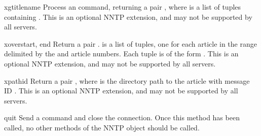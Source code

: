 \begin{methoddesc}{xgtitle}{name}
Process an  command, returning a pair , where  is a list of tuples containing
.
This is an optional NNTP extension, and may not be supported by all
servers.
\end{methoddesc}

\begin{methoddesc}{xover}{start, end}
Return a pair .   is a list
of tuples, one for each article in the range delimited by the 
and  article numbers.  Each tuple is of the form
.
This is an optional NNTP extension, and may not be supported by all
servers.
\end{methoddesc}

\begin{methoddesc}{xpath}{id}
Return a pair , where  is the
directory path to the article with message ID .  This is an
optional NNTP extension, and may not be supported by all servers.
\end{methoddesc}

\begin{methoddesc}{quit}{}
Send a  command and close the connection.  Once this method
has been called, no other methods of the NNTP object should be called.
\end{methoddesc}
